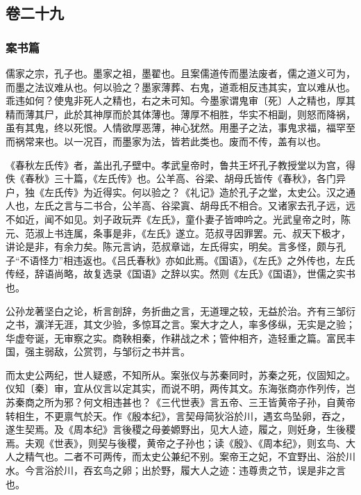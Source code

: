 \documentclass[]{article}
\begin{document}
\hypertarget{header-n899}{%
\subsection{卷二十九}\label{header-n899}}

\hypertarget{header-n900}{%
\subsubsection{案书篇}\label{header-n900}}

儒家之宗，孔子也。墨家之祖，墨翟也。且案儒道传而墨法废者，儒之道义可为，而墨之法议难从也。何以验之？墨家薄葬、右鬼，道乖相反违其实，宜以难从也。乖违如何？使鬼非死人之精也，右之未可知。今墨家谓鬼审〔死〕人之精也，厚其精而薄其尸，此於其神厚而於其体薄也。薄厚不相胜，华实不相副，则怒而降祸，虽有其鬼，终以死恨。人情欲厚恶薄，神心犹然。用墨子之法，事鬼求福，福罕至而祸常来也。以一况百，而墨家为法，皆若此类也。废而不传，盖有以也。

《春秋左氏传》者，盖出孔子壁中。孝武皇帝时，鲁共王坏孔子教授堂以为宫，得佚《春秋》三十篇，《左氏传》也。公羊高、谷梁、胡母氏皆传《春秋》，各门异户，独《左氏传》为近得实。何以验之？《礼记》造於孔子之堂，太史公。汉之通人也，左氏之言与二书合，公羊高、谷梁寘、胡母氏不相合。又诸家去孔子远，远不如近，闻不如见。刘子政玩弄《左氏》，童仆妻子皆呻吟之。光武皇帝之时，陈元、范淑上书连属，条事是非，《左氏》遂立。范叔寻因罪罢。元、叔天下极才，讲论是非，有余力矣。陈元言讷，范叔章诎，左氏得实，明矣。言多怪，颇与孔子``不语怪力''相违返也。《吕氏春秋》亦如此焉。《国语》，《左氏》之外传也，左氏传经，辞语尚略，故复选录《国语》之辞以实。然则《左氏》《国语》，世儒之实书也。

公孙龙著坚白之论，析言剖辞，务折曲之言，无道理之较，无益於治。齐有三邹衍之书，瀇洋无涯，其文少验，多惊耳之言。案大才之人，率多侈纵，无实是之验；华虚夸诞，无审察之实。商鞅相秦，作耕战之术；管仲相齐，造轻重之篇。富民丰国，强主弱敌，公赏罚，与邹衍之书并言。

而太史公两纪，世人疑惑，不知所从。案张仪与苏秦同时，苏秦之死，仪固知之。仪知〔秦〕审，宜从仪言以定其实，而说不明，两传其文。东海张商亦作列传，岂苏秦商之所为邪？何文相违甚也？《三代世表》言五帝、三王皆黄帝子孙，自黄帝转相生，不更禀气於天。作《殷本纪》，言契母简狄浴於川，遇玄鸟坠卵，吞之，遂生契焉。及《周本纪》言後稷之母姜嫄野出，见大人迹，履之，则妊身，生後稷焉。夫观《世表》，则契与後稷，黄帝之子孙也；读《殷》、《周本纪》，则玄鸟、大人之精气也。二者不可两传，而太史公兼纪不别。案帝王之妃，不宜野出、浴於川水。今言浴於川，吞玄鸟之卵；出於野，履大人之迹：违尊贵之节，误是非之言也。
\end{document}

